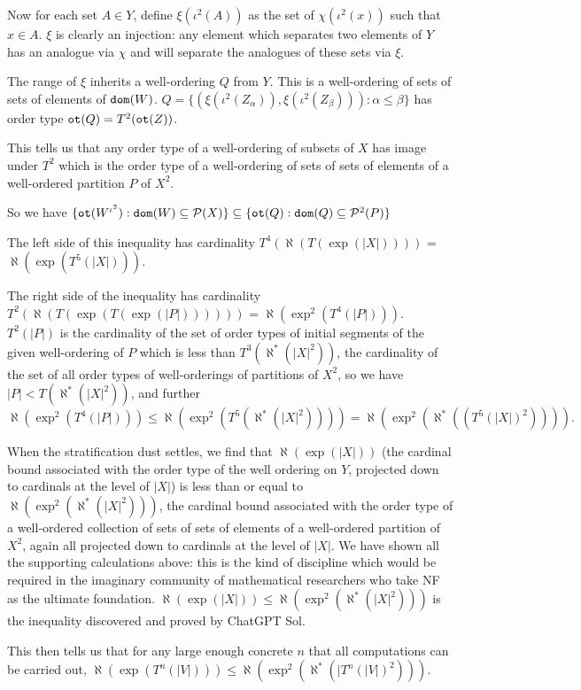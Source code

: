 \documentclass[12pt]{article}
\begin{document}
Now for each set $A \in Y$, define $\xi(\iota^2(A))$ as the set of $\chi(\iota^2(x))$ such that
$x \in A$.  $\xi$ is clearly an injection:  any element which separates two elements of $Y$ has an analogue via $\chi$ and will separate the analogues of these sets via $\xi$.  

The range of $\xi$ inherits a well-ordering $Q$ from $Y$.  This is a well-ordering of sets of sets of elements of
${\tt dom}(W)$.   $Q = \{(\xi(\iota^2(Z_\alpha)),\xi(\iota^2(Z_\beta))):\alpha \leq \beta\}$ has order type ${\tt ot}(Q) = T^2({\tt ot}(Z))$.

This tells us that any order type of a well-ordering of subsets of $X$ has image under $T^2$ which is the order type of a well-ordering of sets of sets of elements of a well-ordered partition $P$ of $X^2$.

So we have $\{{\tt ot}(W^{\iota^2}):{\tt dom}(W) \subseteq {\cal P}(X)\} \subseteq \{{\tt ot}(Q): {\tt dom}(Q) \subseteq {\cal P}^2(P)\}$

The left side of this inequality has cardinality $T^4(\aleph(T(\exp(|X|))))$ = $\aleph(\exp(T^5(|X|)))$.

The right side of the inequality has cardinality $T^2(\aleph(T(\exp(T(\exp(|P|))))))$ = $\aleph(\exp^2(T^4(|P|)))$.     $T^2(|P|)$ is the cardinality of the set of order types of initial segments of the given well-ordering of $P$ which is less than $T^3(\aleph^*(|X|^2))$, the cardinality of the set of all order types of well-orderings of partitions of $X^2$, so we have $|P|<T(\aleph^*(|X|^2))$, and further $$\aleph(\exp^2(T^4(|P|)))\leq \aleph(\exp^2(T^5(\aleph^*(|X|^2)))) = \aleph(\exp^2(\aleph^*((T^5(|X|)^2)))).$$

When the stratification dust settles, we find that $\aleph(\exp(|X|))$ (the cardinal bound associated with the order type of the well ordering on $Y$, projected down to cardinals at the level of $|X|$) is less than or equal to $\aleph(\exp^2(\aleph^*(|X|^2)))$, the cardinal bound associated with the order type of a well-ordered collection of sets of sets of elements of a well-ordered partition of $X^2$, again all projected down to cardinals at the level of $|X|$.  We have shown all the supporting calculations above:  this is the kind of discipline which would be required in the imaginary community of mathematical researchers who take NF as the ultimate foundation.
$\aleph(\exp(|X|)) \leq \aleph(\exp^2(\aleph^*(|X|^2)))$ is the inequality discovered and proved by ChatGPT Sol.

This then tells us that for any large enough concrete $n$ that all computations can be carried out, $\aleph(\exp(T^n(|V|))) \leq \aleph(\exp^2(\aleph^*(|T^n(|V|)^2)))$.
\end{document}

